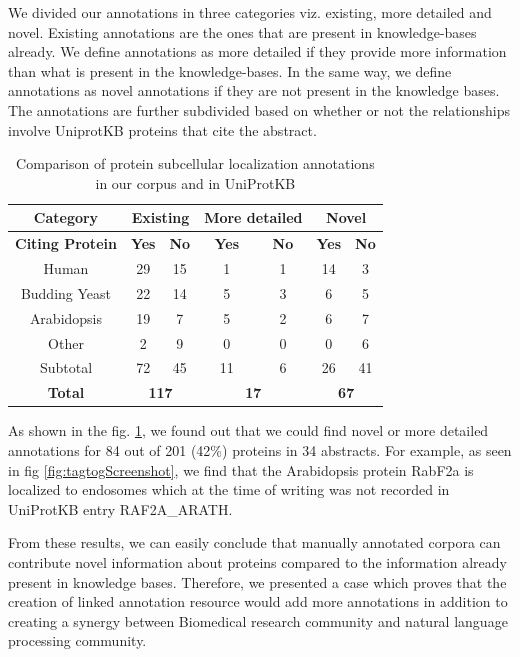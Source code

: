 We divided our annotations in three categories viz. existing, more detailed and novel. Existing annotations are the ones that are present in knowledge-bases already. We define annotations as more detailed if they provide more information than what is present in the knowledge-bases. In the same way, we define annotations as novel annotations if they are not present in the knowledge bases. The annotations are further subdivided based on whether or not the relationships involve UniprotKB proteins that cite the abstract.

\begin{table}
\centering
\begin{tabular}{|c|c|c|c|c|c|c|}
\hline
\textbf{Category} & \multicolumn{2}{c|}{\textbf{Existing}} & \multicolumn{2}{c|}{\textbf{More detailed}} & \multicolumn{2}{c|}{\textbf{Novel}} \\ 
\hline
\textbf{Citing Protein} & \textbf{Yes} & \textbf{No} & \textbf{Yes} & \textbf{No} & \textbf{Yes} & \textbf{No} \\
\hline
Human & 29 & 15 & 1 & 1 & 14 & 3 \\
Budding Yeast & 22 & 14 & 5 & 3 & 6 & 5 \\
Arabidopsis & 19 & 7 & 5 & 2 & 6 & 7 \\
Other & 2 & 9 & 0 & 0 & 0 & 6 \\
\hline
Subtotal & 72 & 45 & 11 & 6 & 26 & 41 \\
\hline
\textbf{Total} & \multicolumn{2}{c|}{\textbf{117}} & \multicolumn{2}{c|}{\textbf{17}} & \multicolumn{2}{c|}{\textbf{67}} \\ 
 \hline
\end{tabular}
\caption{Comparison of protein subcellular localization annotations in our corpus
and in UniProtKB}\label{tab:novelAnnotation}
\end{table}

As shown in the fig. \ref{tab:novelAnnotation}, we found out that we could find novel or more detailed annotations for 84 out of 201 (42\%) proteins in 34 abstracts. For example, as seen in fig \ref{fig:tagtogScreenshot}, we find that the Arabidopsis protein RabF2a is localized to endosomes which at the time of writing was not recorded in UniProtKB entry RAF2A\_ARATH.

From these results, we can easily conclude that manually annotated corpora can contribute novel information about proteins compared to the information already present in knowledge bases. Therefore, we presented a case which proves that the creation of linked annotation resource would add more annotations in addition to creating a synergy between Biomedical research community and natural language processing community.

